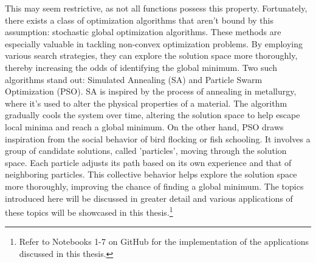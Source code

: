 This may seem restrictive, as not all functions possess this property. Fortunately, there exists a class of optimization algorithms that aren't bound by this assumption: stochastic global optimization algorithms. These methods are especially valuable in tackling non-convex optimization problems. By employing various search strategies, they can explore the solution space more thoroughly, thereby increasing the odds of identifying the global minimum. Two such algorithms stand out: Simulated Annealing (SA) and Particle Swarm Optimization (PSO). SA is inspired by the process of annealing in metallurgy, where it's used to alter the physical properties of a material. The algorithm gradually cools the system over time, altering the solution space to help escape local minima and reach a global minimum. On the other hand, PSO draws inspiration from the social behavior of bird flocking or fish schooling. It involves a group of candidate solutions, called 'particles', moving through the solution space. Each particle adjusts its path based on its own experience and that of neighboring particles. This collective behavior helps explore the solution space more thoroughly, improving the chance of finding a global minimum. The topics introduced here will be discussed in greater detail and various applications of these topics will be showcased in this thesis.\footnote{Refer to Notebooks 1-7 on GitHub \cite{ThesisCode2023} for the implementation of the applications discussed in this thesis.}





















